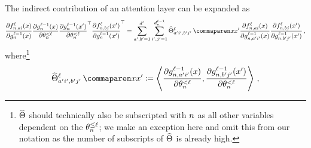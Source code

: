 The indirect contribution of an attention layer can be expanded as
\begin{align*}
    \frac{
        \partial \indexedActivation{\depthSymbol}{\sequenceVariable, \fIndexA i}{\inputSymbol}
    }{
        \partial \indexedActivity{\depthSymbol - 1}{\sequenceVariable}{\inputSymbol}
    }
    \frac{
        \partial \indexedActivity{\depthSymbol - 1}{\sequenceVariable}{\inputSymbol}
    }{
        \partial \params_{\sequenceVariable}^{< \depthSymbol}
    }
        \frac{
            \partial \indexedActivity{\depthSymbol - 1}{\sequenceVariable}{\inputSymbol'}
        }{
            \partial \params_{\sequenceVariable}^{< \depthSymbol}
        }^\top
        \frac{
            \partial \indexedActivation{\depthSymbol}{\sequenceVariable, \fIndexB j}{\inputSymbol'}
        }{
            \partial \indexedActivity{\depthSymbol - 1}{\sequenceVariable}{\inputSymbol'}
        }^\top
    =
    \sum_{\gIndexA, \gIndexB = 1}^{\spatialDimension}
    \sum_{\gIndexZA, \gIndexZB = 1}^{\layerDimension{\depthSymbol - 1}}
        \ntkhatf{
            \gIndexA \gIndexZA , \gIndexB \gIndexZB
        }{\depthSymbol}{\inputSymbol}{\inputSymbol'}
        \frac{
            \partial \indexedActivation{\depthSymbol}{\sequenceVariable, \fIndexA i}{\inputSymbol}
        }{
            \partial \indexedActivity{\depthSymbol - 1}{\sequenceVariable, \gIndexA \gIndexZA}{\inputSymbol}
        }
        \frac{
            \partial \indexedActivation{\depthSymbol}{\sequenceVariable, \fIndexB j}{\inputSymbol'}
        }{
            \partial \indexedActivity{\depthSymbol - 1}{\sequenceVariable, \gIndexB \gIndexZB}{\inputSymbol'}
        }
    \, ,
\end{align*}
where\footnote{$\widehat{\Theta}$ should technically also be subscripted with $n$ as all other variables dependent on the $\theta_{n}^{\leq \ell}$; we make an exception here and omit this from our notation as the number of subscripts of $\widehat{\Theta}$ is already high.}
\begin{align}\label{eq:ntk_hat}
    \ntkhatf{
        \gIndexA \gIndexZA , \gIndexB \gIndexZB
    }{\depthSymbol}{\inputSymbol}{\inputSymbol'}
    \coloneqq
    \left\langle
        \frac{
            \partial \indexedActivity{\depthSymbol - 1}{\sequenceVariable, \gIndexA \gIndexZA}{\inputSymbol}
        }{
            \partial \params_{\sequenceVariable}^{< \depthSymbol}
        }
        ,
        \frac{
            \partial \indexedActivity{\depthSymbol - 1}{\sequenceVariable, \gIndexB \gIndexZB}{\inputSymbol'}
        }{
            \partial \params_{\sequenceVariable}^{< \depthSymbol}
        }
    \right\rangle
    \, ,
\end{align}
